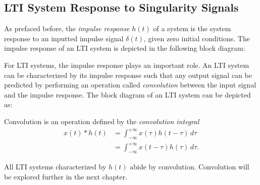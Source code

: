 \documentclass{report}
\begin{document}
\subsection{LTI System Response to Singularity Signals}
As prefaced before, the \emph{impulse response} $h(t)$ of a system is the system response to an inputted impulse signal $\delta(t)$, given zero initial conditions. 
The impulse response of an LTI system is depicted in the following block diagram:
\begin{center}
\end{center}
For LTI systems, the impulse response plays an important role. An LTI system can be characterized by its impulse response such that any output signal can be predicted by 
performing an operation called \emph{convolution} between the input signal and the impulse response. The block diagram of an LTI system can be depicted as:
\begin{center}
\end{center}
\begin{tcolorbox}[width=\textwidth,colback={white}, sharp corners]
    Convolution is an operation defined by the \emph{convolution integral}
    \begin{align}
        x(t) * h(t) &= \int_{-\infty}^{+\infty} x(\tau)h(t-\tau) \,d\tau \\
        &= \int_{-\infty}^{+\infty} x(t-\tau)h(\tau) \,d\tau.
    \end{align}
\end{tcolorbox}
All LTI systems characterized by $h(t)$ abide by convolution. Convolution will be explored further in the next chapter.
\end{document}
